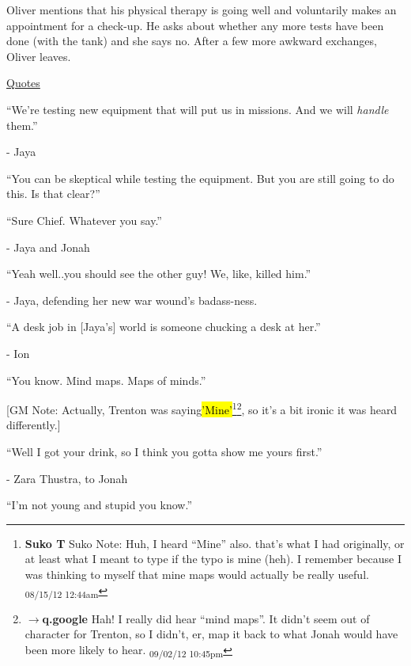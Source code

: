 Oliver mentions that his physical therapy is going well and voluntarily makes an appointment for a check-up.  He asks about whether any more tests have been done (with the tank) and she says no.  After a few more awkward exchanges, Oliver leaves.



\underline{  {\LARGE Quotes }  }



``We're testing new equipment that will put us in missions. And we will \textit{handle }them.''

- Jaya



``You can be skeptical while testing the equipment.  But you are still going to do this.  Is that clear?''

``Sure Chief.  Whatever you say.''

                - Jaya and Jonah



``Yeah well..you should see the other guy!  We, like, killed him.''

- Jaya, defending her new war wound's badass-ness.



``A desk job in {[}Jaya's{]} world is someone chucking a desk at her.''

- Ion



``You know.  Mind maps.  Maps of minds.''


{[}GM Note: Actually, Trenton was saying\hl{'Mine'}\footnote{\textbf{Suko T }Suko Note: Huh, I heard ``Mine'' also. that's what I had originally, or at least what I meant to type if the typo is mine (heh).  I remember because I was thinking to myself that mine maps would actually be really useful. \textsubscript{08/15/12 12:44am}}\footnote{$\rightarrow$\textbf{q.google }Hah!  I really did hear ``mind maps''.  It didn't seem out of character for Trenton, so I didn't, er, map it back to what Jonah would have been more likely to hear. \textsubscript{09/02/12 10:45pm}}, so it's a bit ironic it was heard differently.{]}



``Well I got your drink, so I think you gotta show me yours first.''

- Zara Thustra, to Jonah



``I'm not young and stupid you know.''


